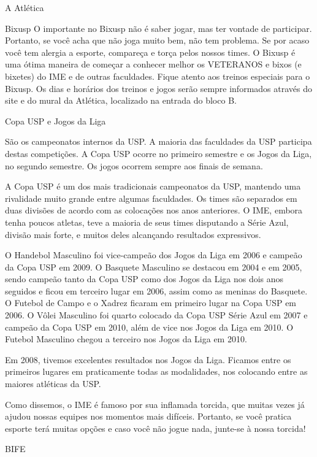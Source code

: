 \begin{secao}{A Atlética}
\begin{subsecao}{Bixusp}
O importante no Bixusp não é saber jogar, mas ter vontade de participar.
Portanto, se você acha que não joga muito bem, não tem problema. Se por acaso
você tem alergia a esporte, compareça e torça pelos nossos times. O Bixusp é uma
ótima maneira de começar a conhecer melhor os VETERANOS e bixos (e bixetes) do
IME e de outras faculdades. Fique atento aos treinos especiais para o Bixusp.
Os dias e horários dos treinos e jogos serão sempre informados através do site
e do mural da Atlética, localizado na entrada do bloco B.

\end{subsecao}
\begin{subsecao}{Copa USP e Jogos da Liga}

São os campeonatos internos da USP. A maioria das faculdades da USP participa
destas competições. A Copa USP ocorre no primeiro semestre e os Jogos da Liga,
no segundo semestre. Os jogos ocorrem sempre aos finais de semana.

A Copa USP é um dos mais tradicionais campeonatos da USP, mantendo uma
rivalidade muito grande entre algumas faculdades. Os times são separados em
duas divisões de acordo com as colocações nos anos anteriores. O IME, embora
tenha poucos atletas, teve a maioria de seus times disputando a Série Azul,
divisão mais forte, e muitos deles alcançando resultados expressivos.

O Handebol Masculino foi vice-campeão dos Jogos da Liga em 2006 e campeão da
Copa USP em 2009. O Basquete Masculino se destacou em 2004 e em 2005, sendo
campeão tanto da Copa USP como dos Jogos da Liga nos dois anos seguidos e ficou
em terceiro lugar em 2006, assim como as meninas do Basquete. O Futebol de
Campo e o Xadrez ficaram em primeiro lugar na Copa USP em 2006. O Vôlei
Masculino foi quarto colocado da Copa USP Série Azul em 2007 e campeão da Copa
USP em 2010, além de vice nos Jogos da Liga em 2010. O Futebol Masculino chegou
a terceiro nos Jogos da Liga em 2010.

Em 2008, tivemos excelentes resultados nos Jogos da Liga. Ficamos entre os
primeiros lugares em praticamente todas as modalidades, nos colocando entre as
maiores atléticas da USP.

Como dissemos, o IME é famoso por sua inflamada torcida, que muitas vezes já
ajudou nossas equipes nos momentos mais difíceis. Portanto, se você pratica
esporte terá muitas opções e caso você não jogue nada, junte-se à nossa torcida!

\end{subsecao}
\begin{subsecao}{BIFE}


\end{subsecao}
\end{secao}
